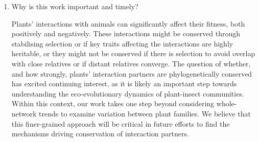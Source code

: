 \documentclass[12pt]{letter}
\begin{document}
\begin{letter}
\begin{enumerate}
		\smallskip

	
		\item Why is this work important and timely?
		\smallskip


		Plants' interactions with animals can significantly affect their fitness, both positively and negatively. These interactions might be conserved through stabilising selection or if key traits affecting the interactions are highly heritable, or they might not be conserved if there is selection to avoid overlap with close relatives or if distant relatives converge. The question of whether, and how strongly, plants' interaction partners are phylogenetically conserved has excited continuing interest, as it is likely an important step towards understanding the eco-evolutionary dynamics of plant-insect communities. Within this context, our work takes one step beyond considering whole-network trends to examine variation between plant families. We believe that this finer-grained approach will be critical in future efforts to find the mechanisms driving conservation of interaction partners.







\end{enumerate}
\end{letter}
\end{document}
